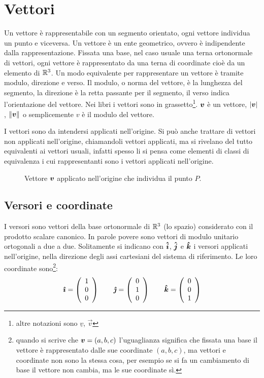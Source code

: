 \chapter{Vettori}
\minitoc
Un vettore è rappresentabile con un segmento orientato, ogni vettore individua un punto e viceversa. Un vettore è un ente geometrico, ovvero è indipendente dalla rappresentazione. Fissata una base, nel caso usuale una terna ortonormale di vettori, ogni vettore è rappresentato da una terna di coordinate cioè da un elemento di $\mathbb{R}^3$. Un modo equivalente per rappresentare un vettore è tramite modulo, direzione e verso. Il modulo, o norma del vettore, è la lunghezza del segmento, la direzione è la retta passante per il segmento, il verso indica l'orientazione del vettore. Nei libri i vettori sono in grassetto\footnote{altre notazioni sono $\underline v$, $\vec{v}$}. $\boldsymbol{v}$ è un vettore, $|\boldsymbol{v}|$, $\left\lVert\boldsymbol{v}\right\rVert$ o semplicemente $v$ è il modulo del vettore.

I vettori sono da intendersi applicati nell'origine. Si può anche trattare di vettori non applicati nell'origine, chiamandoli vettori applicati, ma si rivelano del tutto equivalenti ai vettori usuali, infatti spesso li si pensa come elementi di classi di equivalenza i cui rappresentanti sono i vettori applicati nell'origine.
\begin{figure}[htbp]
  \centering
  
  \caption{Vettore $\boldsymbol{v}$ applicato nell'origine che individua il punto $P$.}
\end{figure}
\section{Versori e coordinate}
I versori sono vettori della base ortonormale di $\mathbb{R}^3$ (lo spazio) considerato con il prodotto scalare canonico. In parole povere sono vettori di modulo unitario ortogonali a due a due. Solitamente si indicano con $\boldsymbol{\hat {i}}$, $\boldsymbol{\hat {j}}$ e $\boldsymbol{\hat {k}}$ i versori applicati nell'origine, nella direzione degli assi cartesiani del sistema di riferimento. Le loro coordinate sono\footnote{quando si scrive che $\boldsymbol{v}=(a,b,c)$ l'uguaglianza significa che fissata una base il vettore è rappresentato dalle sue coordinate $(a,b,c)$, ma vettori e coordinate non sono la stessa cosa, per esempio se si fa un cambiamento di base il vettore non cambia, ma le sue coordinate sì.}:
\[
  \boldsymbol{\hat {\imath}}=\left(\begin{array}{c} 1\\0\\0\\ \end{array}\right)\qquad
  \boldsymbol{\hat {\jmath}}=\left(\begin{array}{c} 0\\1\\0\\ \end{array}\right)\qquad
  \boldsymbol{\hat {k}}=\left(\begin{array}{c} 0\\0\\1\\ \end{array}\right)
\]

